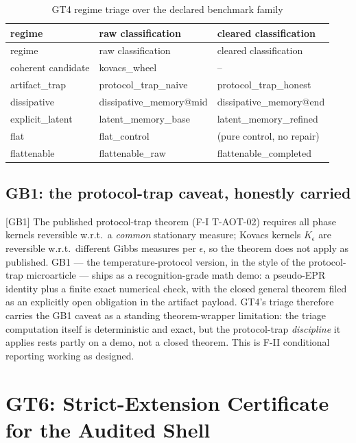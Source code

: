 \documentclass[11pt]{article}
\newcommand{\claimref}[2]{[#1]}
\newcommand{\sbtcite}[1]{\cite{#1}}
\theoremstyle{definition}
\begin{document}
\begin{longtable}{lll}
\caption{GT4 regime triage over the declared benchmark family}\label{tab:gt4-regime-triage} \\
\toprule
regime & raw classification & cleared classification \\
\midrule
\endfirsthead
\toprule
regime & raw classification & cleared classification \\
\midrule
\endhead
\bottomrule
\endfoot
coherent candidate & kovacs\_wheel & -- \\
artifact\_trap & protocol\_trap\_naive & protocol\_trap\_honest \\
dissipative & dissipative\_memory@mid & dissipative\_memory@end \\
explicit\_latent & latent\_memory\_base & latent\_memory\_refined \\
flat & flat\_control & (pure control, no repair) \\
flattenable & flattenable\_raw & flattenable\_completed \\
\bottomrule
\end{longtable}
 
\subsection{GB1: the protocol-trap caveat, honestly carried}

\claimref{GB1}{4173705a52c358bc74b51815929cb2a28c8f680b3421dafdb7633e97b051fa8e}
The published protocol-trap theorem (F-I T-AOT-02) requires all phase kernels reversible w.r.t.\ a
\emph{common} stationary measure; Kovacs kernels $K_\epsilon$ are reversible w.r.t.\ different
Gibbs measures per $\epsilon$, so the theorem does not apply as published. GB1 --- the
temperature-protocol version, in the style of the protocol-trap microarticle
\sbtcite{sbt-protocol-trap} --- ships as a recognition-grade math demo: a pseudo-EPR identity
plus a finite exact numerical check, with the closed general theorem filed as an explicitly open
obligation in the artifact payload. GT4's triage therefore carries the GB1 caveat as a standing
theorem-wrapper limitation: the triage computation itself is deterministic and exact, but the
protocol-trap \emph{discipline} it applies rests partly on a demo, not a closed theorem. This is
F-II conditional reporting working as designed.
 \section{GT6: Strict-Extension Certificate for the Audited Shell}
\label{sec:gt6}
\end{document}
